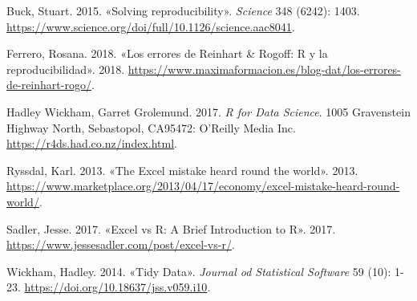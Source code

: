 \documentclass[
  letterpaper,
  DIV=11,
  numbers=noendperiod,
  oneside]{scrreprt}
\newlength{\cslhangindent}
\newlength{\cslentryspacingunit} %
\newenvironment{CSLReferences}[2] %
 {%
  \setlength{\parindent}{0pt}
  \ifodd #1
  \let\oldpar\par
  \def\par{\hangindent=\cslhangindent\oldpar}
  \fi
  \setlength{\parskip}{#2\cslentryspacingunit}
 }%
 {}
\begin{document}

\hypertarget{refs}{}
\begin{CSLReferences}{1}{0}
\leavevmode{}%
Buck, Stuart. 2015. {«Solving reproducibility»}. \emph{Science} 348
(6242): 1403.
\url{https://www.science.org/doi/full/10.1126/science.aac8041}.

\leavevmode{}%
Ferrero, Rosana. 2018. {«Los errores de Reinhart \& Rogoff: R y la
reproducibilidad»}. 2018.
\url{https://www.maximaformacion.es/blog-dat/los-errores-de-reinhart-rogo/}.

\leavevmode{}%
Hadley Wickham, Garret Grolemund. 2017. \emph{R for Data Science}. 1005
Gravenstein Highway North, Sebastopol, CA95472: O'Reilly Media Inc.
\url{https://r4ds.had.co.nz/index.html}.

\leavevmode{}%
Ryssdal, Karl. 2013. {«The Excel mistake heard round the world»}. 2013.
\url{https://www.marketplace.org/2013/04/17/economy/excel-mistake-heard-round-world/}.

\leavevmode{}%
Sadler, Jesse. 2017. {«Excel vs R: A Brief Introduction to R»}. 2017.
\url{https://www.jessesadler.com/post/excel-vs-r/}.

\leavevmode{}%
Wickham, Hadley. 2014. {«Tidy Data»}. \emph{Journal od Statistical
Software} 59 (10): 1-23. \url{https://doi.org/10.18637/jss.v059.i10}.

\end{CSLReferences}
\end{document}
